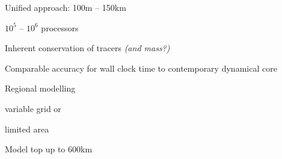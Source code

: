 \begin{slide}


\begin{list0}
\item Unified approach: 100m -- 150km
\item $10^5$ -- $10^6$ processors
\item Inherent conservation of tracers {\color{purple}\it (and mass?)}
\item Comparable accuracy for wall clock time to contemporary dynamical core
\item Regional modelling
    \begin{list1}
    \item variable grid or
    \item limited area
    \end{list1}
\item Model top up to 600km
\end{list0}

\end{slide}

